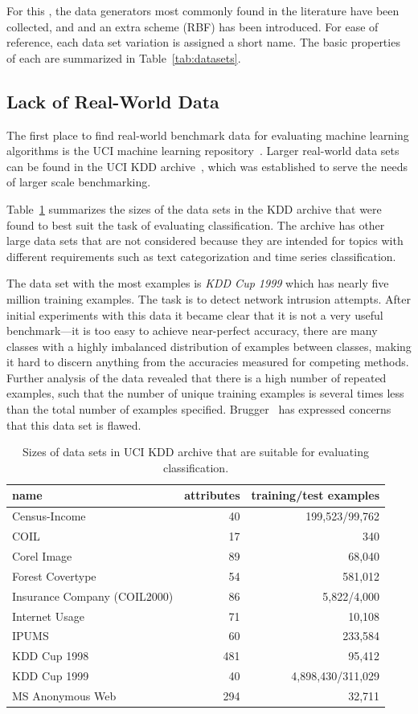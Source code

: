 For this \thesisc, the data generators most commonly found in the literature have been collected, and and an extra scheme (RBF) has been introduced. For ease of reference, each data set variation is assigned a short name. The basic properties of each are summarized in Table~\ref{tab:datasets}.

\BEGINOMIT
\subsection{Lack of Real-World Data}
\label{sec:reallack}

The first place to find real-world benchmark data for evaluating machine learning algorithms is the UCI machine learning repository~\cite{uci}. Larger real-world data sets can be found in the UCI KDD archive~\cite{ucikdd}, which was established to serve the needs of larger scale benchmarking.

Table~\ref{tab:ucikddsizes} summarizes the sizes of the data sets in the KDD archive that were found to best suit the task of evaluating classification. The archive has other large data sets that are not considered because they are intended for topics with different requirements such as text categorization and time series classification.

The data set with the most examples is {\em KDD Cup 1999} which has nearly five million training examples. The task is to detect network intrusion attempts. After initial experiments with this data it became clear that it is not a very useful benchmark---it is too easy to achieve near-perfect accuracy, there are many classes with a highly imbalanced distribution of examples between classes, making it hard to discern anything from the accuracies measured for competing methods. Further analysis of the data revealed that there is a high number of repeated examples, such that the number of unique training examples is several times less than the total number of examples specified. Brugger~\cite{kdd99flaw} has expressed concerns that this data set is flawed.

\begin{table}
\caption{Sizes of data sets in UCI KDD archive that are suitable for evaluating classification.}
\centering
\begin{tabular}{|l|r|r|}
\hline					
name	&	attributes	&	training/test examples	\\
\hline					
Census-Income	&	40	&	199,523/99,762	\\
COIL	&	17	&	340	\\
Corel Image	&	89	&	68,040	\\
Forest Covertype	&	54	&	581,012	\\
Insurance Company (COIL2000)	&	86	&	5,822/4,000	\\
Internet Usage	&	71	&	10,108	\\
IPUMS	&	60	&	233,584	\\
KDD Cup 1998	&	481	&	95,412	\\
KDD Cup 1999	&	40	&	4,898,430/311,029	\\
MS Anonymous Web	&	294	&	32,711	\\
\hline					
\end{tabular}
\label{tab:ucikddsizes}
\end{table}

